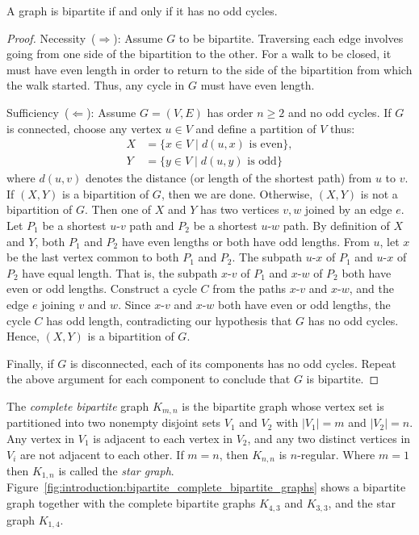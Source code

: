 \begin{theorem}
A graph is bipartite if and only if it has no odd cycles.
\end{theorem}

\begin{proof}
Necessity~($\Longrightarrow$): Assume $G$ to be bipartite. Traversing
each edge involves going from one side of the bipartition to the
other. For a walk to be closed, it must have even length in order to
return to the side of the bipartition from which the walk
started. Thus, any cycle in $G$ must have even length.

Sufficiency~($\Longleftarrow$): Assume $G = (V, E)$ has order
$n \geq 2$ and no odd cycles. If $G$ is connected, choose any vertex
$u \in V$ and define a partition of $V$ thus:
\begin{align*}
X &= \{x \in V \mid d(u,x) \text{ is even}\}, \\
Y &= \{y \in V \mid d(u,y) \text{ is odd}\}
\end{align*}
where $d(u,v)$ denotes the distance (or length of the shortest path)
from $u$ to $v$. If $(X, Y)$ is a bipartition of $G$, then we are
done. Otherwise, $(X, Y)$ is not a bipartition of $G$. Then one of $X$
and $Y$ has two vertices $v,w$ joined by an edge $e$. Let $P_1$ be a
shortest $u$-$v$ path and $P_2$ be a shortest $u$-$w$ path. By
definition of $X$ and $Y$, both $P_1$ and $P_2$ have even lengths or
both have odd lengths. From $u$, let $x$ be the last vertex common to
both $P_1$ and $P_2$. The subpath $u$-$x$ of $P_1$ and $u$-$x$ of
$P_2$ have equal length. That is, the subpath $x$-$v$ of $P_1$ and
$x$-$w$ of $P_2$ both have even or odd lengths. Construct a cycle $C$
from the paths $x$-$v$ and $x$-$w$, and the edge $e$ joining $v$ and
$w$. Since $x$-$v$ and $x$-$w$ both have even or odd lengths, the
cycle $C$ has odd length, contradicting our hypothesis that $G$ has no
odd cycles. Hence, $(X,Y)$ is a bipartition of $G$.

Finally, if $G$ is disconnected, each of its components has no odd
cycles. Repeat the above argument for each component to conclude that
$G$ is bipartite.
\end{proof}

The \emph{complete bipartite} graph
$K_{m,n}$ is the bipartite graph whose vertex set is
partitioned into two nonempty disjoint sets $V_1$ and $V_2$ with
$|V_1| = m$ and $|V_2| = n$. Any vertex in $V_1$ is adjacent to each
vertex in $V_2$, and any two distinct vertices in $V_i$ are not
adjacent to each other. If $m = n$, then $K_{n,n}$ is
$n$-regular. Where $m = 1$ then $K_{1,n}$ is called the
\emph{star graph}.
Figure~\ref{fig:introduction:bipartite_complete_bipartite_graphs}
shows a bipartite graph together with the complete bipartite graphs
$K_{4,3}$ and $K_{3,3}$, and the star graph $K_{1,4}$.

